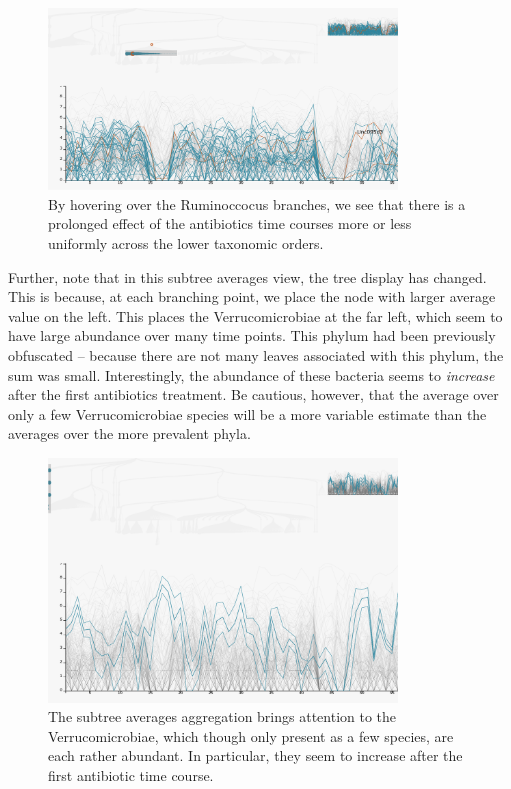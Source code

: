 \documentclass[12pt]{article}
\begin{document}
\begin{figure}

{\centering \includegraphics[width=350px]{figure/ruminococcus} 

}

\caption{By hovering over the Ruminoccocus branches, we see that there is a prolonged effect of the antibiotics time courses more or less uniformly across the lower taxonomic orders.}\label{fig:ruminococcus}
\end{figure}

Further, note that in this subtree averages view, the tree display has
changed. This is because, at each branching point, we place the node
with larger average value on the left. This places the Verrucomicrobiae
at the far left, which seem to have large abundance over many time
points. This phylum had been previously obfuscated -- because there are
not many leaves associated with this phylum, the sum was small.
Interestingly, the abundance of these bacteria seems to \emph{increase}
after the first antibiotics treatment. Be cautious, however, that the
average over only a few Verrucomicrobiae species will be a more variable
estimate than the averages over the more prevalent phyla.

\begin{figure}

{\centering \includegraphics[width=350px]{figure/verrucomicrobiae} 

}

\caption{The subtree averages aggregation brings attention to the Verrucomicrobiae, which though only present as a few species, are each rather abundant. In particular, they seem to increase after the first antibiotic time course.}\label{fig:verrucomicrobiae}
\end{figure}
\end{document}
